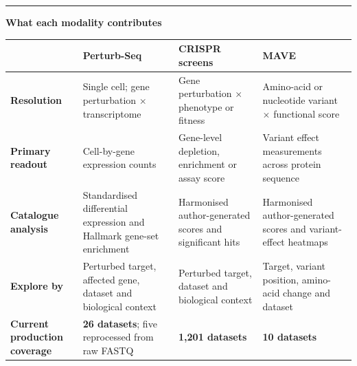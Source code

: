 \documentclass[20pt]{extarticle}
\newcommand{\sectiontitle}[2]{%
  \vspace{4mm}%
  {\color{#1}\rule{\linewidth}{1.6mm}}\par\vspace{2mm}%
  {\fontsize{39}{43}\selectfont\bfseries #2}\par\vspace{3mm}}
\newcommand{\smallcopy}{\fontsize{20}{25}\selectfont}
\begin{document}
\sectiontitle{Cyan}{What each modality contributes}
{\smallcopy
\renewcommand{\arraystretch}{1.45}
\setlength{\tabcolsep}{5mm}
\begin{tabularx}{\linewidth}{L{123mm}YYY}
\toprule[1.2mm]
& \textbf{\color{Cyan}\Large Perturb-Seq}
& \textbf{\color{Orange}\Large CRISPR screens}
& \textbf{\color{Magenta}\Large MAVE}\\
\midrule[.6mm]
\textbf{Resolution} & Single cell; gene perturbation $\times$ transcriptome & Gene perturbation $\times$ phenotype or fitness & Amino-acid or nucleotide variant $\times$ functional score\\
\textbf{Primary readout} & Cell-by-gene expression counts & Gene-level depletion, enrichment or assay score & Variant effect measurements across protein sequence\\
\textbf{Catalogue analysis} & Standardised differential expression and Hallmark gene-set enrichment & Harmonised author-generated scores and significant hits & Harmonised author-generated scores and variant-effect heatmaps\\
\textbf{Explore by} & Perturbed target, affected gene, dataset and biological context & Perturbed target, dataset and biological context & Target, variant position, amino-acid change and dataset\\
\textbf{Current production coverage} & \textbf{26 datasets}; five reprocessed from raw FASTQ & \textbf{1,201 datasets} & \textbf{10 datasets}\\
\bottomrule[1.2mm]
\end{tabularx}}

\vspace{7mm}
\end{document}
